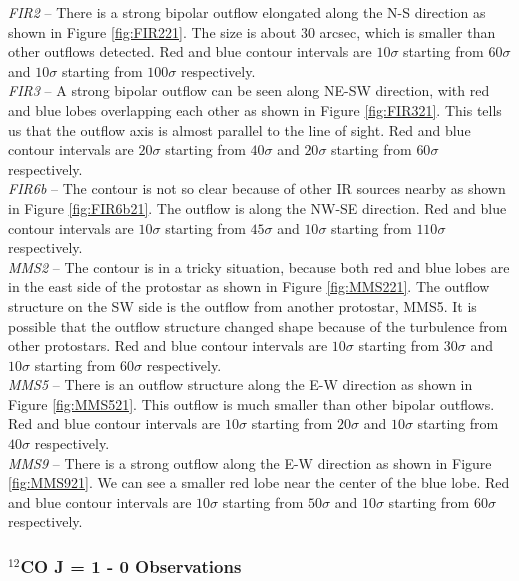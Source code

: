 \noindent\textit{FIR2} -- There is a strong bipolar outflow elongated along the N-S direction as shown in Figure \ref{fig:FIR221}. The size is about 30 arcsec, which is smaller than other outflows detected. Red and blue contour intervals are $10\sigma$ starting from $60\sigma$ and $10\sigma$ starting from $100\sigma$ respectively.\\
\textit{FIR3} -- A strong bipolar outflow can be seen along NE-SW direction, with red and blue lobes overlapping each other as shown in Figure \ref{fig:FIR321}. This tells us that the outflow axis is almost parallel to the line of sight. Red and blue contour intervals are $20\sigma$ starting from $40\sigma$ and $20\sigma$ starting from $60\sigma$ respectively. \\
\textit{FIR6b} -- The contour is not so clear because of other IR sources nearby as shown in Figure \ref{fig:FIR6b21}. The outflow is along the NW-SE direction. Red and blue contour intervals are $10\sigma$ starting from $45\sigma$ and $10\sigma$ starting from $110\sigma$ respectively.\\
\textit{MMS2} -- The contour is in a tricky situation, because both red and blue lobes are in the east side of the protostar as shown in Figure \ref{fig:MMS221}. The outflow structure on the SW side is the outflow from another protostar, MMS5. It is possible that the outflow structure changed shape because of the turbulence from other protostars. Red and blue contour intervals are $10\sigma$ starting from $30\sigma$ and $10\sigma$ starting from $60\sigma$ respectively.\\
\textit{MMS5} -- There is an outflow structure along the E-W direction as shown in Figure \ref{fig:MMS521}. This outflow is much smaller than other bipolar outflows. Red and blue contour intervals are $10\sigma$ starting from $20\sigma$ and $10\sigma$ starting from $40\sigma$ respectively.\\
\textit{MMS9} -- There is a strong outflow along the E-W direction as shown in Figure \ref{fig:MMS921}. We can see a smaller red lobe near the center of the blue lobe. Red and blue contour intervals are $10\sigma$ starting from $50\sigma$ and $10\sigma$ starting from $60\sigma$ respectively.\\

\subsubsection{$^{12}$CO J = 1 - 0 Observations}


